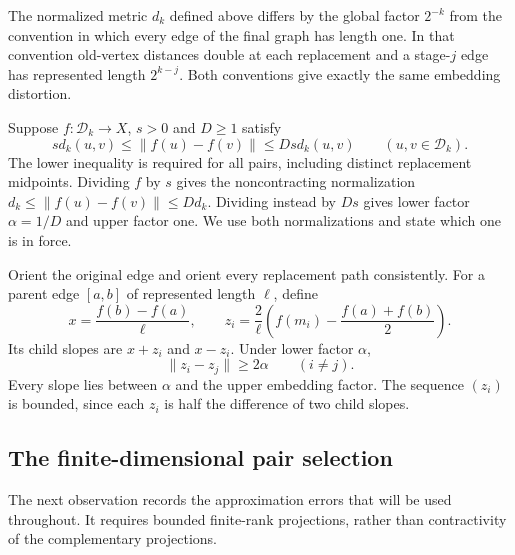 

The normalized metric $d_k$ defined above differs by the global factor
$2^{-k}$ from the convention
in which every edge of the final graph has length one. In that convention
old-vertex distances double at each replacement and a stage-$j$ edge has
represented length $2^{k-j}$. Both conventions give exactly the same
embedding distortion.

Suppose $f:\mathcal D_k\to X$, $s>0$ and $D\ge1$ satisfy
\begin{equation}\label{met:all-pairs}
 s d_k(u,v)\le\|f(u)-f(v)\|\le Ds d_k(u,v)
 \qquad(u,v\in\mathcal D_k).
\end{equation}
The lower inequality is required for all pairs, including distinct
replacement midpoints. Dividing $f$ by $s$ gives the noncontracting
normalization $d_k\le\|f(u)-f(v)\|\le Dd_k$. Dividing instead by $Ds$
gives lower factor $\alpha=1/D$ and upper factor one. We use both
normalizations and state which one is in force.

Orient the original edge and orient every replacement path consistently.
For a parent edge $[a,b]$ of represented length $\ell$, define
\begin{equation}\label{met:slopes}
 x=\frac{f(b)-f(a)}{\ell},\qquad
 z_i=\frac{2}{\ell}\left(f(m_i)-\frac{f(a)+f(b)}2\right).
\end{equation}
Its child slopes are $x+z_i$ and $x-z_i$. Under lower factor $\alpha$,
\begin{equation}\label{met:sibling-separation}
 \|z_i-z_j\|\ge2\alpha\qquad(i\ne j).
\end{equation}
Every slope lies between $\alpha$ and the upper embedding factor. The
sequence $(z_i)$ is bounded, since each $z_i$ is half the difference of
two child slopes.

\subsection{The finite-dimensional pair selection}\label{met:pairing-section}
The next observation records the approximation errors that will be used
throughout. It requires bounded finite-rank projections, rather than
contractivity of the complementary projections.

